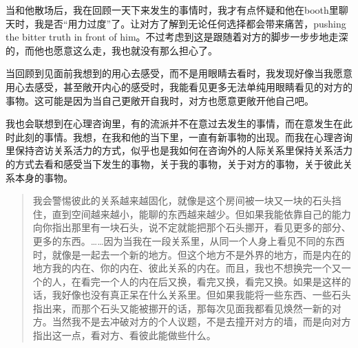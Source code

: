 当和他散场后，我在回顾一天下来发生的事情时，我才有点怀疑和他在booth里聊天时，我是否“用力过度”了。让对方了解到无论任何选择都会带来痛苦，pushing the bitter truth in front of him。不过考虑到这是跟随着对方的脚步一步步地走深的，而他也愿意这么走，我也就没有那么担心了。

\tristarsepline

当回顾到见面前我想到的用心去感受，而不是用眼睛去看时，我发现好像当我愿意用心去感受，甚至敞开内心的感受时，我能看见更多无法单纯用眼睛看见的对方的事物。这可能是因为当自己更敞开自我时，对方也愿意更敞开他自己吧。

我也会联想到在心理咨询里，有的流派并不在意过去发生的事情，而在意发生在此时此刻的事情。我想，在我和他的当下里，一直有新事物的出现。而我在心理咨询里保持咨访关系活力的方式，似乎也是我如何在咨询外的人际关系里保持关系活力的方式\pozhehao{}去看和感受当下发生的事物，关于我的事物，关于对方的事物，关于彼此关系本身的事物。

\blockquote{
    我会警惕彼此的关系越来越固化，就像是这个房间被一块又一块的石头挡住，直到空间越来越小，能聊的东西越来越少。但如果我能依靠自己的能力向你指出那里有一块石头，说不定就能把那个石头挪开，看见更多的部分、更多的东西。……因为当我在一段关系里，从同一个人身上看见不同的东西时，就像是一起去一个新的地方。但这个地方不是外界的地方，而是内在的地方\pozhehao{}我的内在、你的内在、彼此关系的内在。而且，我也不想换完一个又一个的人，在看完一个人的内在后又换，看完又换，看完又换。如果是这样的话，我好像也没有真正呆在什么关系里。但如果我能将一些东西、一些石头指出来，而那个石头又能被挪开的话，那每次见面我都看见焕然一新的对方。当然我不是去冲破对方的个人议题，不是去撞开对方的墙，而是向对方指出这一点，看对方、看彼此能做些什么。

}

